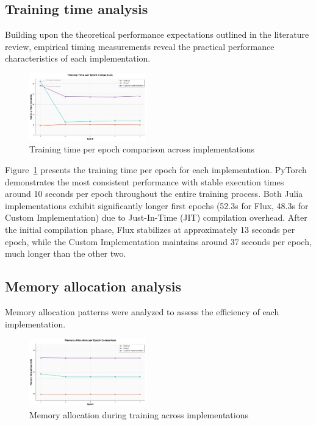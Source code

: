 \documentclass[conference]{IEEEtran}
\begin{document}
\subsection{Training time analysis}

Building upon the theoretical performance expectations outlined in the literature review, 
empirical timing measurements reveal the practical performance characteristics of each implementation.

\begin{figure}[h!]
\centering
\includegraphics[width=0.45\textwidth]{epoch_time_comparison.png}
\caption{Training time per epoch comparison across implementations}
\label{fig:epoch_time}
\end{figure}

Figure~\ref{fig:epoch_time} presents the training time per epoch for each implementation. 
PyTorch demonstrates the most consistent performance with stable execution times around 10 seconds 
per epoch throughout the entire training process. 
Both Julia implementations exhibit significantly longer first epochs 
(52.3s for Flux, 48.3s for Custom Implementation) due to Just-In-Time (JIT) compilation overhead. 
After the initial compilation phase, Flux stabilizes at approximately 13 seconds per epoch, 
while the Custom Implementation maintains around 37 seconds per epoch, much longer than the other two.

\subsection{Memory allocation analysis}
Memory allocation patterns were analyzed to assess the efficiency of each implementation.
\begin{figure}[h!]
\centering
\includegraphics[width=0.45\textwidth]{memory_allocation_comparison.png}
\caption{Memory allocation during training across implementations}
\label{fig:memory_allocation}
\end{figure}
\end{document}
